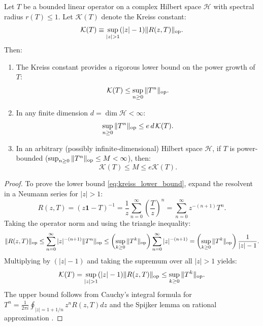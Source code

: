 \begin{theorem}
\label{thm:kreiss}
Let $T$ be a bounded linear operator on a complex Hilbert space $\mathcal{H}$ with spectral radius $r(T) \le 1$. Let $\mathcal{K}(T)$ denote the Kreiss constant:
\begin{equation}
\label{eq:kreiss_constant_def}
\mathcal{K}(T) \equiv \sup_{|z| > 1} (|z| - 1) \|R(z, T)\|_{\mathrm{op}}.
\end{equation}
Then:
\begin{enumerate}
    \item The Kreiss constant provides a rigorous lower bound on the power growth of $T$:
    \begin{equation}
    \label{eq:kreiss_lower_bound}
    \mathcal{K}(T) \le \sup_{n \ge 0} \|T^n\|_{\mathrm{op}}.
    \end{equation}
    \item In any finite dimension $d = \dim \mathcal{H} < \infty$:
    \begin{equation}
    \label{eq:kreiss_upper_bound_finite}
    \sup_{n \ge 0} \|T^n\|_{\mathrm{op}} \le e \, d \, \mathcal{K}(T).
    \end{equation}
    \item In an arbitrary (possibly infinite-dimensional) Hilbert space $\mathcal{H}$, if $T$ is power-bounded ($\sup_{n \ge 0} \|T^n\|_{\mathrm{op}} \le M < \infty$), then:
    \begin{equation}
    \label{eq:kreiss_infinite_dim}
    \mathcal{K}(T) \le M \le e \mathcal{K}(T).
    \end{equation}
\end{enumerate}
\end{theorem}

\begin{proof}
To prove the lower bound \eqref{eq:kreiss_lower_bound}, expand the resolvent in a Neumann series for $|z| > 1$:
\begin{equation}
R(z, T) = (z \mathbf{1} - T)^{-1} = \frac{1}{z} \sum_{n=0}^\infty \left( \frac{T}{z} \right)^n = \sum_{n=0}^\infty z^{-(n+1)} T^n.
\end{equation}
Taking the operator norm and using the triangle inequality:
\begin{equation}
\|R(z, T)\|_{\mathrm{op}} \le \sum_{n=0}^\infty |z|^{-(n+1)} \|T^n\|_{\mathrm{op}} \le \left( \sup_{k \ge 0} \|T^k\|_{\mathrm{op}} \right) \sum_{n=0}^\infty |z|^{-(n+1)} = \left( \sup_{k \ge 0} \|T^k\|_{\mathrm{op}} \right) \frac{1}{|z| - 1}.
\end{equation}
Multiplying by $(|z| - 1)$ and taking the supremum over all $|z| > 1$ yields:
\begin{equation}
\mathcal{K}(T) = \sup_{|z| > 1} (|z| - 1) \|R(z, T)\|_{\mathrm{op}} \le \sup_{k \ge 0} \|T^k\|_{\mathrm{op}}.
\end{equation}
The upper bound follows from Cauchy's integral formula for $T^n = \frac{1}{2\pi i} \oint_{|z| = 1 + 1/n} z^n R(z, T) dz$ and the Spijker lemma on rational approximation \cite{TrefethenEmbree2005}.
\end{proof}

